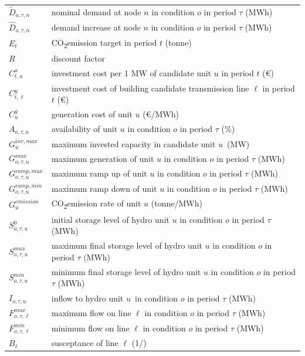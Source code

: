 \documentclass[final]{IEEEtran}
\newcommand{\COtwo}{CO\textsubscript{2}\;}
\begin{document}
\begin{supertabular}{p{1.5cm} p{6.5cm}}
	$\tilde{D}_{o, \tau, n}$ 				& nominal demand at node $n$ in condition $o$ in period $\tau$ (MWh) \\
	$\hat{D}_{o, \tau, n}$ 					& demand increase at node $n$ in condition $o$ in period $\tau$ (MWh) \\
	$E_{t}$ 						& \COtwo emission target in period $t$ (tonne) \\
	$R$ 													& discount factor \\
	$C^x_{t, u}$ 							& investment cost per 1 MW of candidate unit $u$ in period $t$ (€) \\
	$C^y_{t, \ell}$ 			& investment cost of building candidate transmission line $\ell$ in period $t$ (€) \\
	$C^g_{u}$ 			& generation cost of unit $u$ (€/MWh) \\
	$A_{o, \tau, u}$ 				& availability of unit $u$ in condition $o$ in period $\tau$ (\%) \\
	$G^{inv, max}_{u}$ 				& maximum invested capacity in candidate unit $u$ (MW) \\
	$G^{max}_{o, \tau, u}$ 				& maximum generation of unit $u$ in condition $o$ in period $\tau$ (MWh) \\
	$G^{ramp,max}_{o, \tau, u}$		& maximum ramp up of unit $u$ in condition $o$ in period $\tau$ (MWh) \\
	$G^{ramp,min}_{o, \tau, u}$		& maximum ramp down of unit $u$ in condition $o$ in period $\tau$ (MWh) \\
	$G^{emission}_{u}$	& \COtwo emission rate of unit $u$ (tonne/MWh) \\
	$S^0_{o, \tau, u}$ 		& initial storage level of hydro unit $u$ in condition $o$ in period $\tau$ (MWh) \\
	$S^{max}_{o, \tau, u}$ & maximum final storage level of hydro unit $u$ in condition $o$ in period $\tau$ (MWh) \\
	$S^{min}_{o, \tau, u}$ & minimum final storage level of hydro unit $u$ in condition $o$ in period $\tau$ (MWh) \\
	$I_{o, \tau, u}$ 							& inflow to hydro unit $u$ in condition $o$ in period $\tau$ (MWh) \\
	$F^{max}_{o, \tau, \ell}$			& maximum flow on line $\ell$ in condition $o$ in period $\tau$ (MWh) \\
	$F^{min}_{o, \tau, \ell}$			& minimum flow on line $\ell$ in condition $o$ in period $\tau$ (MWh) \\
	$B_\ell$ 											& susceptance of line $\ell$ (1/\Omega) \\

\end{supertabular}
\end{document}
